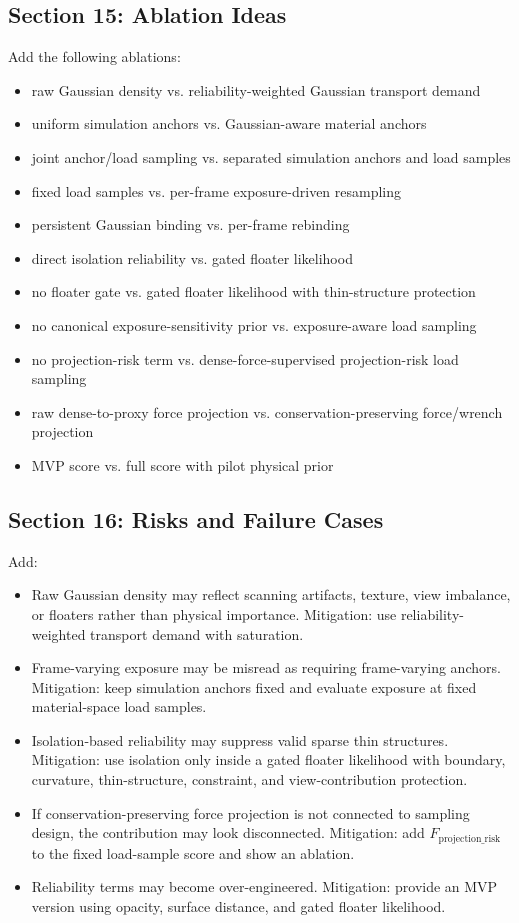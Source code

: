 \documentclass[11pt,a4paper]{article}
\begin{document}
\subsection{Section 15: Ablation Ideas}

Add the following ablations:

\begin{itemize}[leftmargin=2em]
\item raw Gaussian density vs. reliability-weighted Gaussian transport demand
\item uniform simulation anchors vs. Gaussian-aware material anchors
\item joint anchor/load sampling vs. separated simulation anchors and load samples
\item fixed load samples vs. per-frame exposure-driven resampling
\item persistent Gaussian binding vs. per-frame rebinding
\item direct isolation reliability vs. gated floater likelihood
\item no floater gate vs. gated floater likelihood with thin-structure protection
\item no canonical exposure-sensitivity prior vs. exposure-aware load sampling
\item no projection-risk term vs. dense-force-supervised projection-risk load sampling
\item raw dense-to-proxy force projection vs. conservation-preserving force/wrench projection
\item MVP score vs. full score with pilot physical prior
\end{itemize}

\subsection{Section 16: Risks and Failure Cases}

Add:

\begin{itemize}[leftmargin=2em]
\item Raw Gaussian density may reflect scanning artifacts, texture, view imbalance, or floaters rather than physical importance. Mitigation: use reliability-weighted transport demand with saturation.
\item Frame-varying exposure may be misread as requiring frame-varying anchors. Mitigation: keep simulation anchors fixed and evaluate exposure at fixed material-space load samples.
\item Isolation-based reliability may suppress valid sparse thin structures. Mitigation: use isolation only inside a gated floater likelihood with boundary, curvature, thin-structure, constraint, and view-contribution protection.
\item If conservation-preserving force projection is not connected to sampling design, the contribution may look disconnected. Mitigation: add $F_{\mathrm{projection\_risk}}$ to the fixed load-sample score and show an ablation.
\item Reliability terms may become over-engineered. Mitigation: provide an MVP version using opacity, surface distance, and gated floater likelihood.
\end{itemize}
\end{document}
